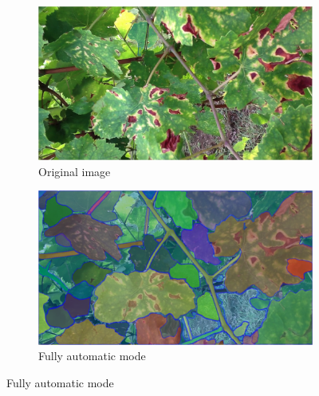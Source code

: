\documentclass[runningheads]{llncs}
\begin{document}
\begin{figure}[h!]
\centering
\begin{subfigure}[b]{.45\linewidth}
    \includegraphics[width=\linewidth]{imgs/segmentation_modes_original.png}
    \caption{Original image}
\end{subfigure}
\begin{subfigure}[b]{.45\linewidth}
    \includegraphics[width=\linewidth]{imgs/segmentation_modes_everything.png}
    \caption{Fully automatic mode}
\end{subfigure}


\end{figure}
\end{document}
